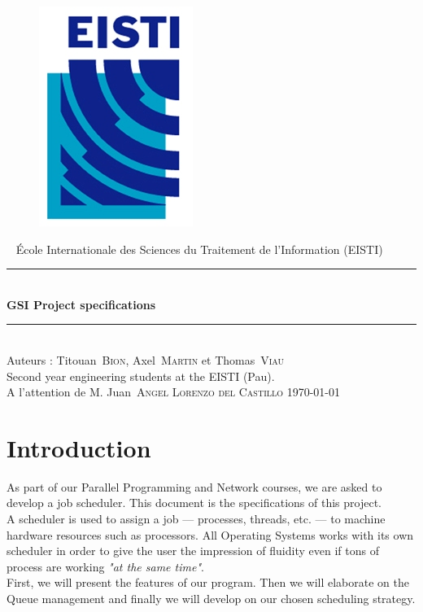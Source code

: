 \documentclass[a4paper,11pt]{article}
\newcommand*{\HRule}{\rule{\linewidth}{0.4mm}}  %
\newcommand*{\auteur}[2]{\large #1~\textsc{#2}} %
\newcommand{\pretitre}{École Internationale des Sciences du Traitement de l'Information (EISTI)}
\newcommand{\grostitre}{GSI Project specifications}
\newcommand{\auteurs}{Auteurs : \auteur{Titouan}{Bion}, \auteur{Axel}{Martin} et \auteur{Thomas}{Viau} \\ Second year engineering students at the EISTI (Pau).}
\newcommand{\correcteurs}{A l'attention de M. \auteur{Juan}{Angel Lorenzo del Castillo}}
\newcommand{\madate}{\today} %
\begin{document}


\begin{titlepage}
\begin{figure}[h]
\includegraphics[scale=1]{images/Logo_EISTI.jpg}
\hfill
\end{figure}
  \begin{center}
    ~
    \vfill
    {\large\pretitre\\}           %
    \vspace{2cm}
    \HRule \\[0.4cm]
    {\Huge\bf\grostitre\\[0.4cm]} %
    \HRule \\[0.4cm]
    \vspace{2cm}
    \auteurs\\                    %
    \medskip
    \vfill
   	\correcteurs
    \vfill
    {\large\madate}               %
  \end{center}
\end{titlepage}



\tableofcontents

\newpage

\section{Introduction}

As part of our Parallel Programming and Network courses, we are asked to develop a job scheduler. This document is the specifications of this project.\\
A scheduler is used to assign a job --- processes, threads, etc. --- to machine hardware resources such as processors. All Operating Systems works with its own scheduler in order to give the user the impression of fluidity even if tons of process are working \textit{"at the same time"}.\\
First, we will present the features of our program. Then we will elaborate on the Queue management and finally we will develop on our chosen scheduling strategy.
\end{document}
